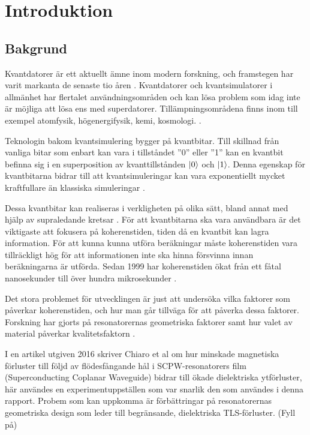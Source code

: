 \documentclass[main.tex]{subfiles}
\begin{document}
\chapter{Introduktion}
\section{Bakgrund}
Kvantdatorer är ett aktuellt ämne inom modern forskning, och framstegen har varit markanta de senaste tio åren \autocite{Bylander2017}. Kvantdatorer och kvantsimulatorer i allmänhet har flertalet användningsområden och kan lösa problem som idag inte är möjliga att lösa ens med superdatorer. Tillämpningsområdena finns inom till exempel atomfysik, högenergifysik, kemi, kosmologi. \cite{applications}.


Teknologin bakom kvantsimulering bygger på kvantbitar. Till skillnad från vanliga bitar som enbart kan vara i tillståndet ''0'' eller ''1'' kan en kvantbit befinna sig i en superposition av kvanttillstånden $\ket{0}$ och $\ket{1}$. Denna egenskap för kvantbitarna bidrar till att kvantsimuleringar kan vara exponentiellt mycket kraftfullare än klassiska simuleringar \cite{Eckstein2013}.

Dessa kvantbitar kan realiseras i verkligheten på olika sätt, bland annat med hjälp av supraledande kretsar \cite{Oliver2013}. För att kvantbitarna ska vara användbara är det viktigaste att fokusera på koherenstiden, tiden då en kvantbit kan lagra information. För att kunna kunna utföra beräkningar måste koherenstiden vara tillräckligt hög för att informationen inte ska hinna försvinna innan beräkningarna är utförda\cite{Eckstein2013}. Sedan 1999 har koherenstiden ökat från ett fåtal nanosekunder till över hundra mikrosekunder \cite{Wendin2016}.

Det stora problemet för utvecklingen är just att undersöka vilka faktorer som påverkar koherenstiden, och hur man går tillväga för att påverka dessa faktorer. Forskning har gjorts på resonatorernas geometriska faktorer \cite{Oliver2013} samt hur valet av material påverkar kvalitetsfaktorn \cite{Eckstein2013}.



I en artikel utgiven 2016 skriver Chiaro et al om hur minskade magnetiska förluster till följd av flödesfångande hål i SCPW-resonatorers film (Superconducting Coplanar Waveguide) bidrar till ökade dielektriska ytförluster, här användes en experimentuppställen som var snarlik den som användes i denna rapport. Probem som kan uppkomma är förbättringar på resonatorernas geometriska design som leder till begränsande, dielektriska TLS-förluster. (Fyll på)
\end{document}
